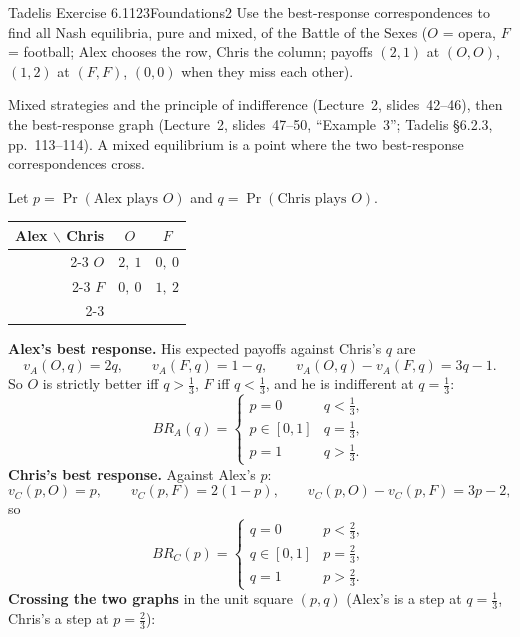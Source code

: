 \begin{exsol}{Tadelis Exercise 6.1}{123}{Foundations}{2}
\asked Use the best-response correspondences to find all Nash equilibria, pure and mixed, of the
Battle of the Sexes ($O$ = opera, $F$ = football; Alex chooses the row, Chris the column; payoffs
$(2,1)$ at $(O,O)$, $(1,2)$ at $(F,F)$, $(0,0)$ when they miss each other).

\method Mixed strategies and the principle of indifference (Lecture~2, slides~42--46), then the
best-response graph (Lecture~2, slides~47--50, ``Example~3''; Tadelis \S6.2.3, pp.~113--114).
A mixed equilibrium is a point where the two best-response correspondences cross.

\solution
Let $p = \Pr(\text{Alex plays } O)$ and $q = \Pr(\text{Chris plays } O)$.
\begin{center}
\begin{tabular}{r|c|c|}
\multicolumn{1}{r}{Alex $\backslash$ Chris} & \multicolumn{1}{c}{$O$} & \multicolumn{1}{c}{$F$}\\ \cline{2-3}
$O$ & $2,\ 1$ & $0,\ 0$ \\ \cline{2-3}
$F$ & $0,\ 0$ & $1,\ 2$ \\ \cline{2-3}
\end{tabular}
\end{center}
\textbf{Alex's best response.} His expected payoffs against Chris's $q$ are
\[
  v_A(O, q) = 2q, \qquad v_A(F, q) = 1 - q, \qquad v_A(O,q) - v_A(F,q) = 3q - 1 .
\]
So $O$ is strictly better iff $q > \tfrac13$, $F$ iff $q < \tfrac13$, and he is indifferent at
$q = \tfrac13$:
\[
  BR_A(q) = \begin{cases} p = 0 & q < \tfrac13,\\ p \in [0,1] & q = \tfrac13,\\ p = 1 & q > \tfrac13.\end{cases}
\]
\textbf{Chris's best response.} Against Alex's $p$:
\[
  v_C(p, O) = p, \qquad v_C(p, F) = 2(1 - p), \qquad v_C(p,O) - v_C(p,F) = 3p - 2,
\]
so
\[
  BR_C(p) = \begin{cases} q = 0 & p < \tfrac23,\\ q \in [0,1] & p = \tfrac23,\\ q = 1 & p > \tfrac23.\end{cases}
\]
\textbf{Crossing the two graphs} in the unit square $(p, q)$ (Alex's is a step at $q = \tfrac13$,
Chris's a step at $p = \tfrac23$):
\begin{itemize}

\end{itemize}
\end{exsol}
